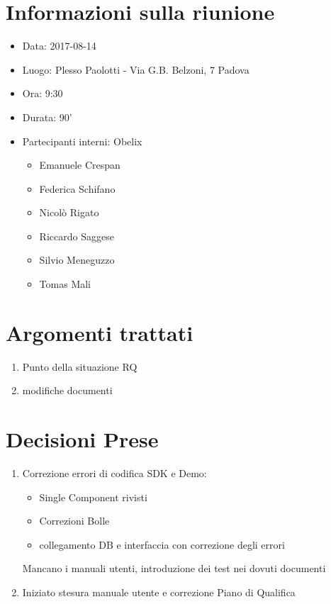 \documentclass[10 pt,a4paper, openany]{article}
\date{}
\begin{document}
\paginatitolo
\section{Informazioni sulla riunione}

\begin{itemize}
\item[] Data: 2017-08-14
\item[] Luogo: Plesso Paolotti - Via G.B. Belzoni, 7 Padova 
\item[] Ora: 9:30
\item[] Durata: 90'
\item[] Partecipanti interni: Obelix
  \begin{itemize}
  \item[] Emanuele Crespan
  \item[] Federica Schifano
  \item[] Nicolò Rigato
  \item[] Riccardo Saggese
  \item[] Silvio Meneguzzo
  \item[] Tomas Mali
 \end{itemize}
\end{itemize}

\section{Argomenti trattati}
\begin{enumerate}
	\item Punto della situazione RQ
	\item modifiche documenti 


	
\end{enumerate}


\section{Decisioni Prese}
\begin{enumerate}
	\item Correzione errori di codifica SDK e Demo:
	\begin{itemize}
		\item Single Component rivisti
		\item Correzioni Bolle 
		\item collegamento DB e interfaccia con correzione degli errori
	\end{itemize}
	Mancano i manuali utenti, introduzione dei test nei dovuti documenti
	
	\item Iniziato stesura manuale utente e correzione Piano di Qualifica
	
		
	
\end{enumerate}
\end{document}
